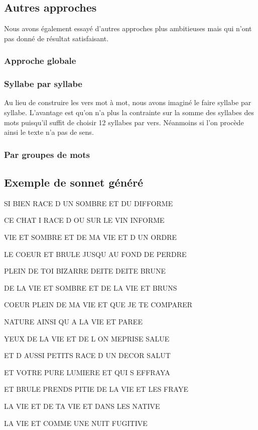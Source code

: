 \documentclass[a4paper,11pt]{article}
\begin{document}
\subsection{Autres approches}

Nous avons également essayé d'autres approches plus ambitieuses mais qui n'ont pas donné de résultat satisfaisant.

\subsubsection{Approche globale}


\subsubsection{Syllabe par syllabe}

Au lieu de construire les vers mot à mot, nous avons imaginé le faire syllabe par syllabe. L'avantage est qu'on n'a plus la contrainte sur la somme des syllabes des mots puisqu'il suffit de choisir 12 syllabes par vers. Néanmoins si l'on procède ainsi le texte n'a pas de sens.

\subsubsection{Par groupes de mots}

\subsection{Exemple de sonnet généré}

\begin{footnotesize}
\begin{itshape}
 SI BIEN RACE D UN SOMBRE ET DU DIFFORME

 CE CHAT I RACE D OU SUR LE VIN INFORME

 VIE ET SOMBRE ET DE MA VIE ET D UN ORDRE

 LE COEUR ET BRULE JUSQU AU FOND DE PERDRE
\medskip

 PLEIN DE TOI BIZARRE DEITE DEITE BRUNE

 DE LA VIE ET SOMBRE ET DE LA VIE ET BRUNS

 COEUR PLEIN DE MA VIE ET QUE JE TE COMPARER
 
 NATURE AINSI QU A LA VIE ET PAREE
\medskip

 YEUX DE LA VIE ET DE L ON MEPRISE SALUE
 
 ET D AUSSI PETITS RACE D UN DECOR SALUT
 
 ET VOTRE PURE LUMIERE ET QUI S EFFRAYA
\medskip

 ET BRULE PRENDS PITIE DE LA VIE ET LES FRAYE
 
 LA VIE ET DE TA VIE ET DANS LES NATIVE
 
 LA VIE ET COMME UNE NUIT FUGITIVE

\end{itshape}
\end{footnotesize}

 
\end{document}

